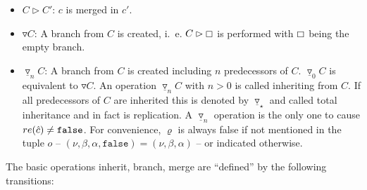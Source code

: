 \documentclass[fleqn, 10pt, a4paper]{report} \usepackage{amssymb}
\begin{document}
\begin{itemize}
\item $C \rhd C'$: $c$ is merged in $c'$.
\item $\triangledown C$: A branch from $C$ is created, i.~e. $C \rhd
  \boxempty$ is performed with $\boxempty$ being the empty branch.
\item $\underline\triangledown_n C$: A branch from $C$ is created
  including $n$ predecessors of $C$. $\underline\triangledown_0 C$ is
  equivalent to $\triangledown C$.  An operation
  $\underline\triangledown_n C$ with $n>0$ is called inheriting from
  $C$.  If all predecessors of $C$ are inherited this is denoted by
  $\underline\triangledown_\star$ and called total inheritance and in
  fact is replication. A $\underline\triangledown_n$ operation is the
  only one to cause $\mathnormal{re}(\hat c)\neq \mathtt{false}$. For
  convenience, $\varrho$ is always false if not mentioned in the tuple
  $o$ -- $(\nu, \beta, \alpha, \mathtt{false})=(\nu, \beta, \alpha)$
  -- or indicated otherwise.
\end{itemize}

The basic operations inherit, branch, merge are ``defined'' by the
following transitions:
\end{document}
